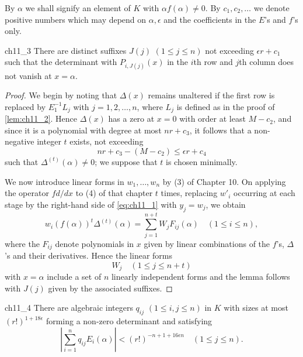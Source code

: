 By $\alpha$ we shall signify an element of $K$ with $\alpha f(\alpha) \neq 0$. By $c_1, c_2, \ldots$ we denote positive numbers which may depend on $\alpha, \epsilon$ and the coefficients in the $E$'s and $f$'s only.

\begin{mylemma}{}{ch11_3}
There are distinct suffixes $J(j)$ $(1 \le j \le n)$ not exceeding $\epsilon r + c_1$ such that the determinant with $P_{i, J(j)}(x)$ in the $i$th row and $j$th column does not vanish at $x = \alpha$.
\end{mylemma}

\begin{proof}
We begin by noting that $\Delta(x)$ remains unaltered if the first row is replaced by $E_1^{-1}L_j$ with $j=1,2,\ldots,n$, where $L_j$ is defined as in the proof of \autoref{lem:ch11_2}. Hence $\Delta(x)$ has a zero at $x=0$ with order at least $M-c_2$, and since it is a polynomial with degree at most $nr+c_3$, it follows that a non-negative integer $t$ exists, not exceeding
\[nr + c_3 - (M - c_2) \leqslant \epsilon r + c_4\]
such that $\Delta^{(t)}(\alpha) \neq 0$; we suppose that $t$ is chosen minimally.

We now introduce linear forms in $w_1, \ldots, w_n$ by (3) of Chapter 10. On applying the operator $f d/dx$ to (4) of that chapter $t$ times, replacing $w'_i$ occurring at each stage by the right-hand side of \eqref{eq:ch11_1} with $y_j = w_j$, we obtain
\[w_i(f(\alpha))^t \Delta^{(t)}(\alpha) = \sum_{j=1}^{n+t} W_j F_{ij}(\alpha) \quad (1 \leq i \leq n),\]
where the $F_{ij}$ denote polynomials in $x$ given by linear combinations of the $f$'s, $\Delta$'s and their derivatives. Hence the linear forms
\[W_j \quad (1 \leqslant j \leqslant n+t)\]
with $x = \alpha$ include a set of $n$ linearly independent forms and the lemma follows with $J(j)$ given by the associated suffixes.
\end{proof}

\begin{mylemma}{}{ch11_4}
There are algebraic integers $q_{ij}$ $(1 \le i, j \le n)$ in $K$ with sizes at most $(r!)^{1+18\epsilon}$ forming a non-zero determinant and satisfying
\[\left|\sum_{i=1}^{n} q_{ij} E_i(\alpha)\right| < (r!)^{-n+1+16\epsilon n} \quad (1 \leq j \leq n). \tag{5}\label{eq:ch11_5}\]
\end{mylemma}

